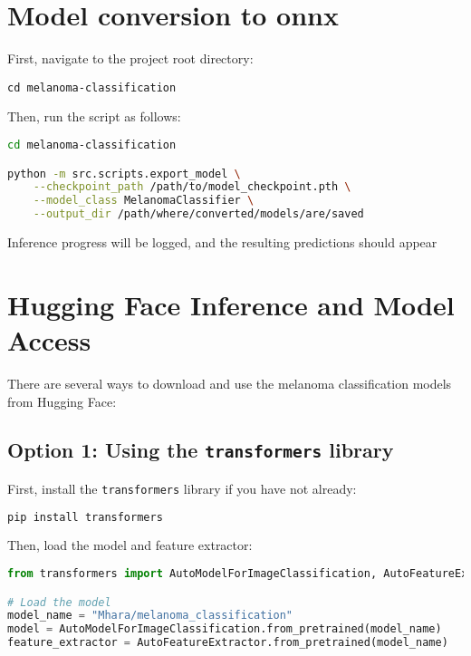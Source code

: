 \section{ Model conversion  to onnx}
First, navigate to the project root directory:

\begin{verbatim}
cd melanoma-classification
\end{verbatim}

Then, run the script as follows:

\begin{lstlisting}[language=bash, caption={Convert model checkpoint to ONNX/TorchScript}, label={lst:model_export}]
cd melanoma-classification

python -m src.scripts.export_model \
    --checkpoint_path /path/to/model_checkpoint.pth \
    --model_class MelanomaClassifier \
    --output_dir /path/where/converted/models/are/saved
\end{lstlisting}


Inference progress will be logged, and the resulting predictions should appear


\section{Hugging Face Inference and Model Access}

There are several ways to download and use the melanoma classification models from Hugging Face:

\subsection{Option 1: Using the \texttt{transformers} library}

First, install the \texttt{transformers} library if you have not already:

\begin{lstlisting}[language=bash, caption={Install Hugging Face Transformers}, label={lst:install_transformers}]
pip install transformers
\end{lstlisting}

Then, load the model and feature extractor:

\begin{lstlisting}[language=Python, caption={Load model and feature extractor from Hugging Face}, label={lst:huggingface_load}]
from transformers import AutoModelForImageClassification, AutoFeatureExtractor

# Load the model
model_name = "Mhara/melanoma_classification"
model = AutoModelForImageClassification.from_pretrained(model_name)
feature_extractor = AutoFeatureExtractor.from_pretrained(model_name)

\end{lstlisting}

